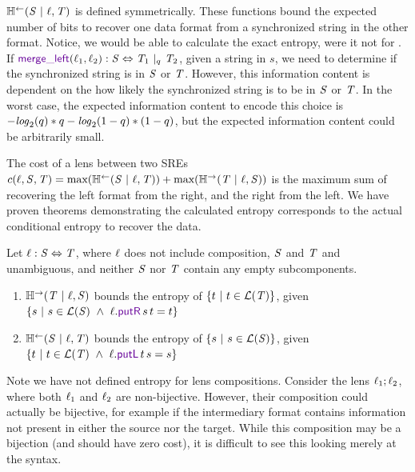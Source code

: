 \documentclass[acmsmall,screen,anonymous]{acmart}
\begin{document}
$\mathbb{H}^\leftarrow(\mathit{S} ~|~ \mathit{\ell}, \mathit{T})$ is defined symmetrically. These
functions bound the expected number of bits to recover one data format from a
synchronized string in the other format. Notice, we would be able to calculate
the exact entropy, were it not for \MergeL. If $\MergeLOf{\Lens_1}{\Lens_2}
\OfType \Regex \Leftrightarrow
\PRegexOr{\RegexAlt_1}{\RegexAlt_2}{\ProbabilityAlt}$, given a string in $s$, we
need to determine if the synchronized string is in $\mathit{S}$ or $\mathit{T}$.
However, this information content is dependent on the how likely the
synchronized string is to be in $\mathit{S}$ or $\mathit{T}$. In the worst case, the
expected information content to encode this choice is
$-\mathit{log}_2(q)*q -\mathit{log}_2(1 -
q)*(1-q)$, but the expected information content
could be arbitrarily small.

The cost of a lens between two SREs $c(\mathit{\ell}, \mathit{S}, \mathit{T}) =
\text{max}(\mathbb{H}^\leftarrow(\mathit{S} ~|~ \mathit{\ell}, \mathit{T})) +
\text{max}(\mathbb{H}^\rightarrow(\mathit{T} ~|~ \mathit{\ell}, \mathit{S}))$ is the maximum sum of
recovering the left format from the right, and the right from the left. We have
proven theorems demonstrating the calculated entropy corresponds to the actual
conditional entropy to recover the data.

\begin{theorem}
  Let $\mathit{\ell} : \mathit{S} \Leftrightarrow \mathit{T}$, where $\mathit{\ell}$ does not
  include composition, $\mathit{S}$ and $\mathit{T}$ and unambiguous, and neither
  $\mathit{S}$ nor $\mathit{T}$ contain any empty subcomponents.
  \begin{enumerate}
  \item $\mathbb{H}^\rightarrow(\mathit{T} ~|~ \mathit{\ell}, \mathit{S})$ bounds the entropy of
    $\{t ~|~ t \in \mathcal{L}(\mathit{T})\}$, given $\SetOf{s
      \SuchThat s \in \LanguageOf{\Regex} \BooleanAnd \Lens.\PutROf{s}{t} = t}$
  \item $\mathbb{H}^\leftarrow(\mathit{S} ~|~ \mathit{\ell}, \mathit{T})$ bounds the entropy of
    $\{s ~|~ s \in \mathcal{L}(\mathit{S})\}$, given $\SetOf{t \SuchThat t
      \in \LanguageOf{\RegexAlt} \BooleanAnd \Lens.\PutLOf{t}{s} = s}$
  \end{enumerate}
\end{theorem}

Note we have not defined entropy for lens compositions. Consider the lens
$\mathit{\ell}_1 ; \mathit{\ell}_2$, where both $\mathit{\ell}_1$ and $\mathit{\ell}_2$ are non-bijective.
However, their composition could actually be bijective, for example if the
intermediary format contains information not present in either the source nor
the target. While this composition may be a bijection (and should have zero
cost), it is difficult to see this looking merely at the syntax.
\end{document}
